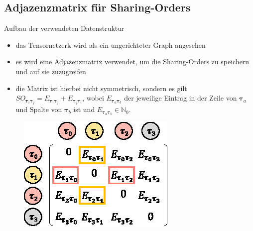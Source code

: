\documentclass{beamer}
\newcommand{\tauB}{\bm{\tau}}
\begin{document}
\subsection{Adjazenzmatrix für Sharing-Orders}

\begin{frame}{Aufbau der verwendeten Datenstruktur}
	\begin{itemize}
		\item das Tensornetzerk wird als ein ungerichteter Graph angesehen
		\item es wird eine Adjazenzmatrix verwendet, um die Sharing-Orders zu speichern und auf sie zuzugreifen
		\item die Matrix ist hierbei nicht symmetrisch,
		      sondern es gilt $SO_{\tauB_i \tauB_j} = E_{\tauB_i \tauB_j} + E_{\tauB_j \tauB_i}$, wobei $E_{\tauB_a \tauB_b}$ der jeweilige Eintrag in der Zeile von $\tauB_a$ und Spalte von $\tauB_b$ ist und $E_{\tauB_a \tauB_b} \in \mathbb{N}_0$.
	\end{itemize}
	\begin{figure}
		\includegraphics{figure_05_a}
	\end{figure}
\end{frame}
\end{document}
